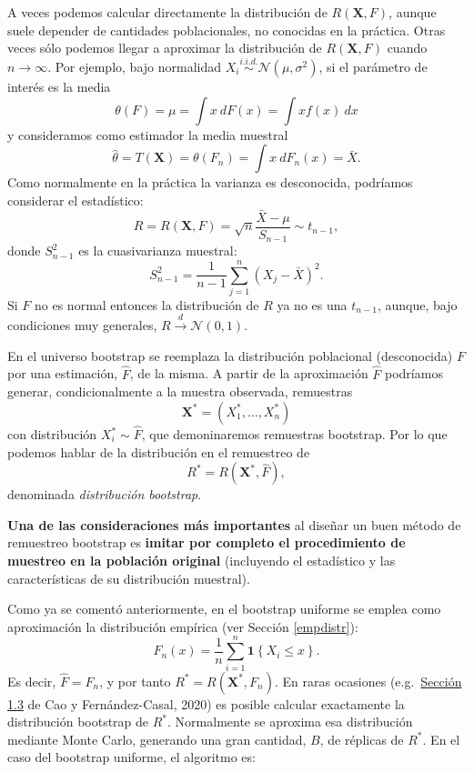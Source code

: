 \documentclass[
  10pt,
]{book}
\renewcommand{\mathbf}[1]{\symbf{#1}}
\theoremstyle{break}
\theoremstyle{nonumberplain}
\begin{document}
A veces podemos calcular directamente la distribución de \(R\left( \mathbf{X},F \right)\), aunque suele depender de cantidades poblacionales, no conocidas en la práctica.
Otras veces sólo podemos llegar a aproximar la distribución de \(R\left( \mathbf{X},F \right)\) cuando \(n \rightarrow \infty\).
Por ejemplo, bajo normalidad \(X_i \overset{i.i.d.}{\sim} \mathcal{N}\left( \mu ,\sigma^2 \right)\), si el parámetro de interés es la media
\[\theta \left( F \right) =\mu =\int x~dF\left( x \right) =\int xf\left( x \right) ~dx\]
y consideramos como estimador la media muestral
\[\hat{\theta} = T\left( \mathbf{X} \right) = \theta \left( F_n \right) =\int x~dF_n\left( x \right) =\bar{X}.\]
Como normalmente en la práctica la varianza es desconocida, podríamos considerar el estadístico:
\[R=R\left( \mathbf{X},F \right) =\sqrt{n}\frac{\bar{X}-\mu }{S_{n-1}} \sim t_{n-1},\]
donde \(S_{n-1}^2\) es la cuasivarianza muestral:
\[S_{n-1}^2=\frac{1}{n-1}\sum_{j=1}^{n}\left( X_j-\bar{X} \right)^2.\]
Si \(F\) no es normal entonces la distribución de \(R\) ya no es una \(t_{n-1}\),
aunque, bajo condiciones muy generales, \(R\overset{d}{\rightarrow}\mathcal{N}\left(0,1 \right)\).

En el universo bootstrap se reemplaza la distribución poblacional (desconocida) \(F\) por una estimación, \(\hat{F}\), de la misma.
A partir de la aproximación \(\hat{F}\) podríamos generar, condicionalmente a la muestra observada, remuestras
\[\mathbf{X}^{\ast}=\left( X_1^{\ast},\ldots ,X_n^{\ast} \right)\]
con distribución \(X_i^{\ast} \sim \hat{F}\), que demoninaremos remuestras bootstrap.
Por lo que podemos hablar de la distribución en el remuestreo de
\[R^{\ast}=R\left( \mathbf{X}^{\ast},\hat{F} \right),\]
denominada \emph{distribución bootstrap}.

\textbf{Una de las consideraciones más importantes} al diseñar un buen método de remuestreo bootstrap es \textbf{imitar por completo el procedimiento de muestreo en la población original} (incluyendo el estadístico y las características de su distribución muestral).

Como ya se comentó anteriormente, en el bootstrap uniforme se emplea como aproximación la distribución empírica (ver Sección \ref{empdistr}):
\[F_n\left( x \right) =\frac{1}{n}\sum_{i=1}^{n}\mathbf{1}\left\{ X_i\leq x\right\}.\]
Es decir, \(\hat{F}=F_n\), y por tanto \(R^{\ast}=R\left( \mathbf{X}^{\ast},F_n \right)\).
En raras ocasiones (e.g.~\href{https://rubenfcasal.github.io/book_remuestreo/c\%C3\%A1lculo-de-la-distribuci\%C3\%B3n-bootstrap-exacta-y-aproximada.html}{Sección 1.3} de Cao y Fernández-Casal, 2020) es posible calcular exactamente la distribución bootstrap de \(R^{\ast}\).
Normalmente se aproxima esa distribución mediante Monte Carlo, generando una gran cantidad, \(B\), de réplicas de \(R^{\ast}\).
En el caso del bootstrap uniforme, el algoritmo es:
\end{document}

